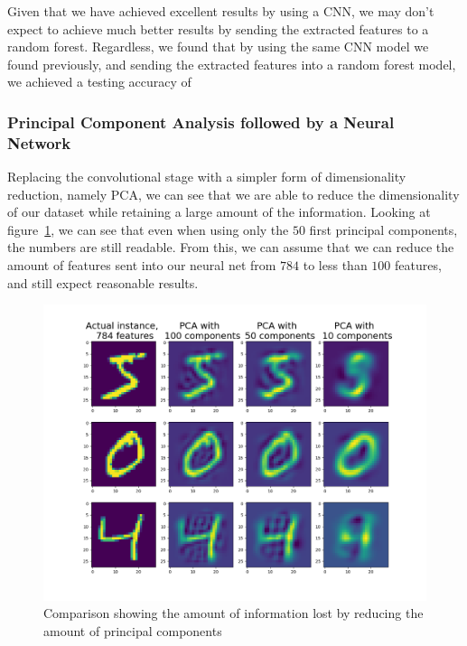 \documentclass[onecolumn,10pt,cleanfoot]{asme2ej}
\begin{document}
Given that we have achieved excellent results by using a CNN, we may don't expect to achieve much better results by sending the extracted features to a random forest. Regardless, we found that by using the same CNN model we found previously, and sending the extracted features into a random forest model, we achieved a testing accuracy of 


\subsubsection{Principal Component Analysis followed by a Neural Network}

Replacing the convolutional stage with a simpler form of dimensionality reduction, namely PCA, we can see that we are able to reduce the dimensionality of our dataset while retaining a large amount of the information. Looking at figure~\ref{pcacomp}, we can see that even when using only the $50$ first principal components, the numbers are still readable. From this, we can assume that we can reduce the amount of features sent into our neural net from $784$ to less than $100$ features, and still expect reasonable results.

\begin{figure}[H]
\centerline{\includegraphics[width=5in]{figure/pcacomp.png}}
\caption{Comparison showing the amount of information lost by reducing the amount of principal components}
\label{pcacomp}
\end{figure}
\end{document}
